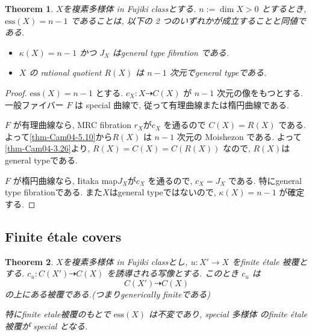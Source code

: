 \documentclass[dvipdfmx,a4paper,11pt]{article} %
\newtheorem{thm}{Theorem}[section]
\theoremstyle{definition}
\theoremstyle{remark}
\numberwithin{equation}{section}
\begin{document}
\begin{thm}\cite[Theorem 5.7]{Cam04}
\label{thm-Cam04-5.7}
$X$を複素多様体 in Fujiki classとする. 
 \( n:=\dim X>0 \) とするとき, \( \mathrm{ess}(X)=n-1 \) であることは, 以下の 2 つのいずれかが成立することと同値である.
\begin{itemize}
\item[(a)] \( \kappa(X)=n-1 \) かつ \( J_X \) はgeneral type fibration である.
\item[(b)] \( X \) の rational quotient \( R(X) \) は \( n-1 \) 次元でgeneral typeである.
\end{itemize}
\end{thm}

\begin{proof}
\( \mathrm{ess}(X)=n-1 \) とする. 
 \( c_X : X\dashrightarrow C(X) \) が \( n-1 \) 次元の像をもつとする. 一般ファイバー \( F \) は special 曲線で, 従って有理曲線または楕円曲線である.

\( F \) が有理曲線なら, MRC fibration $r_X$が\( c_X \) を通るので \( C(X)=R(X) \) である. 
よって\ref{thm-Cam04-5.10}から\( R(X) \) は \( n-1 \) 次元の Moishezon である. 
よって\ref{thm-Cam04-3.26}より,  \( R(X)=C(X) =C(R(X))\) なので, $R(X)$はgeneral typeである.

\( F \) が楕円曲線なら, Iitaka map$J_X$が\( c_X \) を通るので,  \( c_X=J_X \) である. 特にgeneral type fibrationである. 
また$X$はgeneral typeではないので, 
\( \kappa(X)=n-1 \) が確定する. 
\end{proof}


\subsection{Finite étale covers \cite[5.5]{Cam04}}


\begin{thm}\cite[Theorem 5.12]{Cam04}
$X$を複素多様体 in Fujiki classとし, \( u : X' \to X \) をfinite étale 被覆とする.
\( c_{u} : C(X') \dashrightarrow C(X) \) を誘導される写像とする.
このとき \( c_u \) は
\[
C(X') \dashrightarrow C(X)
\]
の上にある被覆である.(つまりgenerically finiteである)

特にfinite etale被覆のもとで \( \mathrm{ess}(X) \) は不変であり, special 多様体 のfinite étale 被覆が special となる. 
\end{thm}
\end{document}
